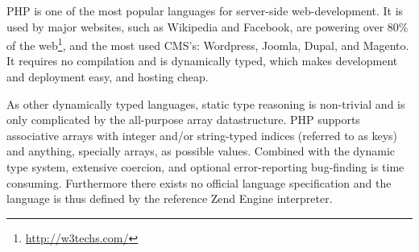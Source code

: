 PHP is one of the most popular languages for server-side web-development. It is used by major websites, such as Wikipedia and Facebook, are powering over 80\% of the web\footnote{\url{http://w3techs.com/}}, and the most used CMS's: Wordpress, Joomla, Dupal, and Magento. It requires no compilation and is dynamically typed, which makes development and deployment easy, and hosting cheap.


As other dynamically typed languages, static type reasoning is non-trivial and is only complicated by the all-purpose array datastructure. PHP supports associative arrays with integer and/or string-typed indices (referred to as keys) and anything, specially arrays, as possible values. Combined with the dynamic type system, extensive coercion, and optional error-reporting   bug-finding is time consuming. Furthermore there exists no official language specification and the language is thus defined by the reference Zend Engine interpreter.


